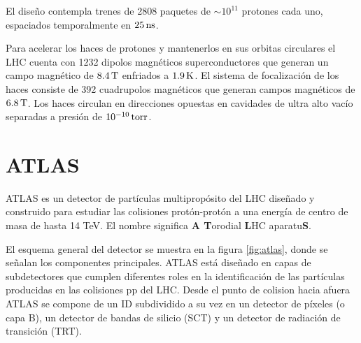 El diseño contempla trenes de 2808 paquetes de $\sim 10^{11}$ protones cada uno,
espaciados temporalmente en $\unit[25]{ns}$.

Para acelerar los haces de protones y mantenerlos en sus orbitas circulares el
LHC cuenta con 1232 dipolos magnéticos superconductores que generan un campo
magnético de $\unit[8.4]{T}$ enfriados a $\unit[1.9]{K}$. El sistema de focalización de los haces
consiste de 392 cuadrupolos magnéticos que generan campos magnéticos de $\unit[6.8]{T}$.
Los haces circulan en direcciones opuestas en cavidades de ultra alto vacío
separadas a presión de $\unit[10^{-10}]{torr}$.


\section{ATLAS}

ATLAS es un detector de partículas multipropósito del LHC diseñado y construido
para estudiar las colisiones protón-protón a una energía de centro de masa de
hasta 14 TeV. El nombre significa \textbf{A T}orodial \textbf{L}HC
aparatu\textbf{S}.




El esquema general del detector se muestra en la figura \ref{fig:atlas}, donde
se señalan los componentes principales. ATLAS está diseñado en capas de
subdetectores que cumplen diferentes roles en la identificación de las
partículas producidas en las colisiones pp del LHC. Desde el punto de colision
hacia afuera ATLAS se compone de un ID subdividido a su vez en un detector de
píxeles (o capa B), un detector de bandas de silicio (SCT) y un detector de
radiación de transición (TRT).

